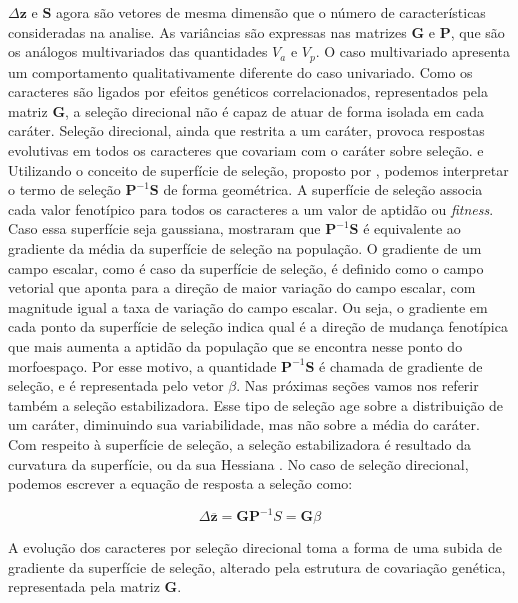 $\Delta \mathbf{z}$ e $\mathbf{S}$ agora são vetores de mesma dimensão que o número
de características consideradas na analise.
As variâncias são expressas nas matrizes $\mathbf{G}$ e $\mathbf{P}$, que são os análogos
multivariados das quantidades $V_a$ e $V_p$.
O caso multivariado apresenta um comportamento qualitativamente
diferente do caso univariado.
Como os caracteres são ligados por efeitos genéticos correlacionados,
representados pela matriz $\mathbf{G}$, a seleção direcional não é capaz de atuar de
forma isolada em cada caráter.
Seleção direcional, ainda que restrita a um caráter, provoca respostas
evolutivas em todos os caracteres que covariam com o caráter sobre
seleção.
e
Utilizando o conceito de superfície de seleção, proposto por
\cite{Wright1932}, podemos interpretar o termo de seleção
$\mathbf{P}^{-1}\mathbf{S}$ de forma geométrica.
A superfície de seleção associa cada valor fenotípico para todos os
caracteres a um valor de aptidão ou {\it fitness}.
Caso essa superfície seja gaussiana, \cite{Lande1983} mostraram que
$\mathbf{P}^{-1}\mathbf{S}$ é equivalente ao gradiente da média da
superfície de seleção na população.
O gradiente de um campo escalar, como é caso da superfície de seleção,
é definido como o campo vetorial que aponta para a direção de maior
variação do campo escalar, com magnitude igual a taxa de variação do
campo escalar.
Ou seja, o gradiente em cada ponto da superfície de seleção indica qual
é a direção de mudança fenotípica que mais aumenta a aptidão da
população que se encontra nesse ponto do morfoespaço.
Por esse motivo, a quantidade $\mathbf{P}^{-1}\mathbf{S}$ é chamada
de gradiente de seleção, e é representada pelo vetor $\beta$.
Nas próximas seções vamos nos referir também a seleção estabilizadora.
Esse tipo de seleção age sobre a distribuição de um caráter, diminuindo
sua variabilidade, mas não sobre a média do caráter.
Com respeito à superfície de seleção, a seleção estabilizadora é
resultado da curvatura da superfície, ou da sua Hessiana
\citep{Lande1983}.
No caso de seleção direcional, podemos escrever a equação de resposta a
seleção como:

\begin{equation}
    \Delta \mathbf{\overline z} = \mathbf{GP}^{-1}S = \mathbf{G}\beta
    \label{landeZGBETA}
\end{equation}

A evolução dos caracteres por seleção direcional toma a forma de uma
subida de gradiente da superfície de seleção, alterado pela estrutura de
covariação genética, representada pela matriz $\mathbf{G}$.

